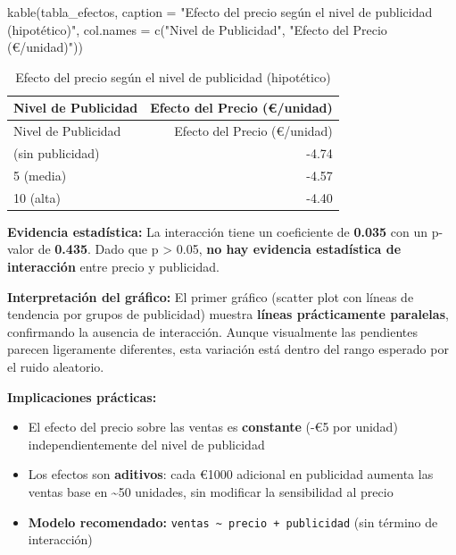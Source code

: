 \documentclass[
  letterpaper,
  DIV=11,
  numbers=noendperiod]{scrreprt}
\newenvironment{Shaded}{\begin{snugshade}}{\end{snugshade}}
\newcommand{\AttributeTok}[1]{\textcolor[rgb]{0.40,0.45,0.13}{#1}}
\newcommand{\FunctionTok}[1]{\textcolor[rgb]{0.28,0.35,0.67}{#1}}
\newcommand{\NormalTok}[1]{\textcolor[rgb]{0.00,0.23,0.31}{#1}}
\newcommand{\StringTok}[1]{\textcolor[rgb]{0.13,0.47,0.30}{#1}}
\providecommand{\tightlist}{%
  \setlength{\itemsep}{0pt}\setlength{\parskip}{0pt}}
\begin{document}
\begin{tcolorbox}
\begin{Shaded}
\begin{Highlighting}[]
\FunctionTok{kable}\NormalTok{(tabla\_efectos, }
      \AttributeTok{caption =} \StringTok{"Efecto del precio según el nivel de publicidad (hipotético)"}\NormalTok{,}
      \AttributeTok{col.names =} \FunctionTok{c}\NormalTok{(}\StringTok{"Nivel de Publicidad"}\NormalTok{, }\StringTok{"Efecto del Precio (€/unidad)"}\NormalTok{))}
\end{Highlighting}
\end{Shaded}

\begin{longtable}[]{@{}lr@{}}
\caption{Efecto del precio según el nivel de publicidad
(hipotético)}\tabularnewline
\toprule\noalign{}
Nivel de Publicidad & Efecto del Precio (€/unidad) \\
\midrule\noalign{}
\endfirsthead
\toprule\noalign{}
Nivel de Publicidad & Efecto del Precio (€/unidad) \\
\midrule\noalign{}
\endhead
\bottomrule\noalign{}
\endlastfoot
0 (sin publicidad) & -4.74 \\
5 (media) & -4.57 \\
10 (alta) & -4.40 \\
\end{longtable}

\textbf{Evidencia estadística:} La interacción tiene un coeficiente de
\textbf{0.035} con un p-valor de \textbf{0.435}. Dado que p
\textgreater{} 0.05, \textbf{no hay evidencia estadística de
interacción} entre precio y publicidad.

\textbf{Interpretación del gráfico:} El primer gráfico (scatter plot con
líneas de tendencia por grupos de publicidad) muestra \textbf{líneas
prácticamente paralelas}, confirmando la ausencia de interacción. Aunque
visualmente las pendientes parecen ligeramente diferentes, esta
variación está dentro del rango esperado por el ruido aleatorio.

\textbf{Implicaciones prácticas:}

\begin{itemize}
\tightlist
\item
  El efecto del precio sobre las ventas es \textbf{constante} (-€5 por
  unidad) independientemente del nivel de publicidad
\item
  Los efectos son \textbf{aditivos}: cada €1000 adicional en publicidad
  aumenta las ventas base en \textasciitilde50 unidades, sin modificar
  la sensibilidad al precio
\item
  \textbf{Modelo recomendado:}
  \texttt{ventas\ \textasciitilde{}\ precio\ +\ publicidad} (sin término
  de interacción)
\end{itemize}


\end{tcolorbox}
\end{document}
